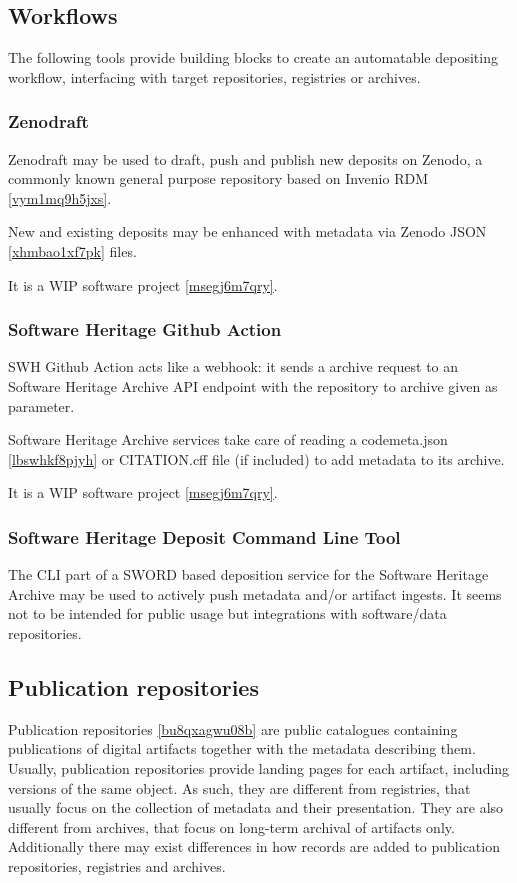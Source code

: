 \documentclass{article}
\begin{document}
\subsection{Workflows}\label{w6t3wd4fqysc}
The following tools provide building blocks to create an automatable depositing workflow, interfacing with target repositories, registries or archives.



\subsubsection{Zenodraft}\label{o71h0jljbmme}
Zenodraft \cite{11045035/VXRILTTG} may be used to draft, push and publish new deposits on Zenodo, a commonly known general purpose repository based on Invenio RDM \ref{vym1mq9h5jxs}.

New and existing deposits may be enhanced with metadata via Zenodo JSON \ref{xhmbao1xf7pk} files.

It is a WIP software project \ref{msegj6m7qry}.



\subsubsection{Software Heritage Github Action}\label{tzwlyl3ildzb}
SWH Github Action \cite{11045035/U5SGIYLE} acts like a webhook: it sends a archive request to an Software Heritage Archive API endpoint with the repository to archive given as parameter.

Software Heritage Archive services take care of reading a codemeta.json \ref{lbswhkf8pjyh} or CITATION.cff \cite{138880/M4MT8YLA} file (if included) to add metadata to its archive.

It is a WIP software project \ref{msegj6m7qry}.



\subsubsection{Software Heritage Deposit Command Line Tool}\label{k8b3f8dzavl}
The CLI part of a SWORD \cite{138880/5XMKCCSZ} based deposition service for the Software Heritage Archive may be used to actively push metadata and/or artifact ingests. It seems not to be intended for public usage but integrations with software/data repositories.



\subsection{Publication repositories}\label{px3vrgozgpce}
Publication repositories \ref{bu8qxagwu08b} are public catalogues containing publications of digital artifacts together with the metadata describing them. Usually, publication repositories provide landing pages for each artifact, including versions of the same object. As such, they are different from registries, that usually focus on the collection of metadata and their presentation. They are also different from archives, that focus on long-term archival of artifacts only. Additionally there may exist differences in how records are added to publication repositories, registries and archives.
\end{document}
